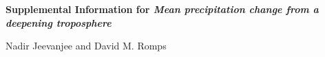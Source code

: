 \documentclass[11pt]{article}
\newcommand{\jump}{\vspace{0.5cm}}
\newcommand{\tauk}{\ensuremath{\tau_\lambda}}
\newcommand{\meter}{\ensuremath{\mathrm{m}}}
\newcommand{\kg}{\ensuremath{\mathrm{kg}}}
\newcommand{\Kelvin}{\ensuremath{\mathrm{K}}}
\newcommand{\Ts}{\ensuremath{T_\mathrm{s}}}
\newcommand{\ps}{\ensuremath{p_s}}
\newcommand{\figurepath}{../../figures/}
\begin{document}
\begin{center}
 \Large{ \bf  Supplemental Information for \emph{Mean precipitation change from a deepening troposphere} }

\jump
\large{Nadir Jeevanjee and David M. Romps}
\end{center}

%
%
% 
\end{document}

